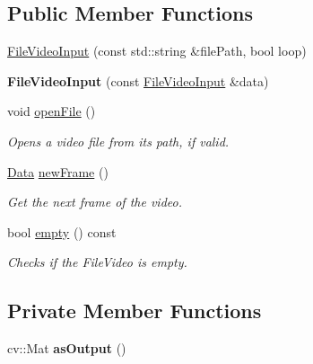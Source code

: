 \subsection*{Public Member Functions}
\begin{DoxyCompactItemize}
\item 
\hyperlink{classfilter_1_1data_1_1_file_video_input_aa585659183e8225ad97fafffe5e58dca}{File\+Video\+Input} (const std\+::string \&file\+Path, bool loop)
\item 
\mbox{\label{classfilter_1_1data_1_1_file_video_input_a569f7c6c2258bfd5d341454e0d1e09dc}} 
{\bfseries File\+Video\+Input} (const \hyperlink{classfilter_1_1data_1_1_file_video_input}{File\+Video\+Input} \&data)
\item 
\mbox{\label{classfilter_1_1data_1_1_file_video_input_aa564a2cee2252263afdbd61dfdab709f}} 
void \hyperlink{classfilter_1_1data_1_1_file_video_input_aa564a2cee2252263afdbd61dfdab709f}{open\+File} ()
\begin{DoxyCompactList}\small\item\em Opens a video file from its path, if valid. \end{DoxyCompactList}\item 
\hyperlink{classfilter_1_1data_1_1_data}{Data} \hyperlink{classfilter_1_1data_1_1_file_video_input_a01a93b368b1a8192c47490ff554ad30f}{new\+Frame} ()
\begin{DoxyCompactList}\small\item\em Get the next frame of the video. \end{DoxyCompactList}\item 
bool \hyperlink{classfilter_1_1data_1_1_file_video_input_a7db00de01c31e63d49a518e737ab8799}{empty} () const
\begin{DoxyCompactList}\small\item\em Checks if the File\+Video is empty. \end{DoxyCompactList}\end{DoxyCompactItemize}
\subsection*{Private Member Functions}
\begin{DoxyCompactItemize}
\item 
\mbox{\label{classfilter_1_1data_1_1_file_video_input_a1795703ad8ea105b857534a32e14f295}} 
cv\+::\+Mat {\bfseries as\+Output} ()
\end{DoxyCompactItemize}

